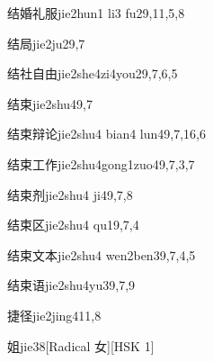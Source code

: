 \begin{entry}{结婚礼服}{jie2hun1 li3 fu2}{9,11,5,8}
\end{entry}

\begin{entry}{结局}{jie2ju2}{9,7}
\end{entry}

\begin{entry}{结社自由}{jie2she4zi4you2}{9,7,6,5}
\end{entry}

\begin{entry}{结束}{jie2shu4}{9,7}
\end{entry}

\begin{entry}{结束辩论}{jie2shu4 bian4 lun4}{9,7,16,6}
\end{entry}

\begin{entry}{结束工作}{jie2shu4gong1zuo4}{9,7,3,7}
\end{entry}

\begin{entry}{结束剂}{jie2shu4 ji4}{9,7,8}
\end{entry}

\begin{entry}{结束区}{jie2shu4 qu1}{9,7,4}
\end{entry}

\begin{entry}{结束文本}{jie2shu4 wen2ben3}{9,7,4,5}
\end{entry}

\begin{entry}{结束语}{jie2shu4yu3}{9,7,9}
\end{entry}

\begin{entry}{捷径}{jie2jing4}{11,8}
\end{entry}

\begin{entry}{姐}{jie3}{8}[Radical 女][HSK 1]
\end{entry}

